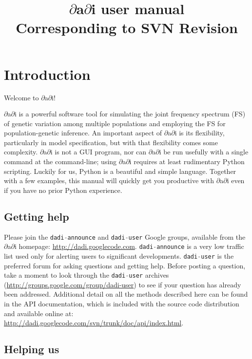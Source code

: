 \documentclass[12pt]{article}
\makeatletter
\newcommand{\dadi}{$\partial$a$\partial$i\xspace}
\newcommand{\py}[1]{\lstinline[language=Python, showstringspaces=False]@#1@}
\makeatother
\begin{document}
\title{\dadi user manual\\\normalsize  Corresponding to SVN $ $Revision$ $}
\date{}
\maketitle

\tableofcontents

\clearpage

\section{Introduction}

Welcome to \dadi!

\dadi is a powerful software tool for simulating the joint frequency spectrum (FS) of genetic variation among multiple populations and employing the FS for population-genetic inference.
An important aspect of \dadi is its flexibility, particularly in model specification, but with that flexibility comes some complexity.
\dadi is not a GUI program, nor can \dadi be run usefully with a single command at the command-line; using \dadi requires at least rudimentary Python scripting.
Luckily for us, Python is a beautiful and simple language.
Together with a few examples, this manual will quickly get you productive with \dadi even if you have no prior Python experience.

\subsection{Getting help}

Please join the \py{dadi-announce} and \py{dadi-user} Google groups, available from the \dadi homepage: \url{http://dadi.googlecode.com}.
\py{dadi-announce} is a very low traffic list used only for alerting users to significant developments.
\py{dadi-user} is the preferred forum for asking questions and getting help.
Before posting a question, take a moment to look through the \py{dadi-user} archives (\url{http://groups.google.com/group/dadi-user}) to see if your question has already been addressed.
Additional detail on all the methods described here can be found in the API documentation, which is included with the source code distribution and available online at: \url{http://dadi.googlecode.com/svn/trunk/doc/api/index.html}.

\subsection{Helping us}
\end{document}
